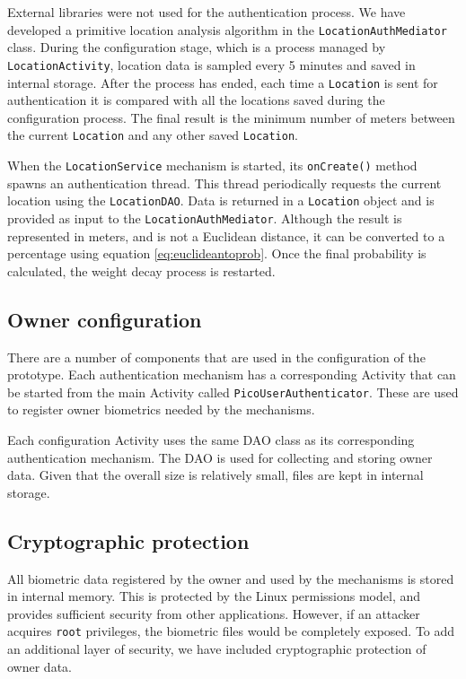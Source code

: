 External libraries were not used for the authentication process. We have developed a primitive location analysis algorithm in the {\tt LocationAuthMediator} class. During the configuration stage, which is a process managed by {\tt LocationActivity}, location data is sampled every 5 minutes and saved in internal storage. After the process has ended, each time a {\tt Location} is sent for authentication it is compared with all the locations saved during the configuration process. The final result is the minimum number of meters between the current {\tt Location} and any other saved {\tt Location}.

When the {\tt LocationService} mechanism is started, its {\tt onCreate()} method spawns an authentication thread. This thread periodically requests the current location using the {\tt LocationDAO}. Data is returned in a {\tt Location} object and is provided as input to the {\tt LocationAuthMediator}. Although the result is represented in meters, and is not a Euclidean distance, it can be converted to a percentage using equation \ref{eq:euclideantoprob}. Once the final probability is calculated, the weight decay process is restarted.

\subsection{Owner configuration}
There are a number of components that are used in the configuration of the prototype. Each authentication mechanism has a corresponding Activity that can be started from the main Activity called {\tt PicoUserAuthenticator}. These are used to register owner biometrics needed by the mechanisms.

Each configuration Activity uses the same DAO class as its corresponding authentication mechanism. The DAO is used for collecting and storing owner data. Given that the overall size is relatively small, files are kept in internal storage.

\subsection{Cryptographic protection}
All biometric data registered by the owner and used by the mechanisms is stored in internal memory. This is protected by the Linux permissions model, and provides sufficient security from other applications. However, if an attacker acquires {\tt root} privileges, the biometric files would be completely exposed. To add an additional layer of security, we have included cryptographic protection of owner data.

